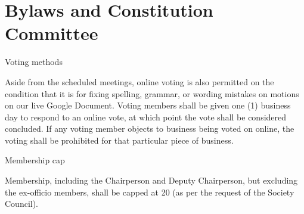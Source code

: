 \section{Bylaws and Constitution Committee}

\begin{longenum}
 \item Voting methods
 \begin{longenum}
 \item Aside from the scheduled meetings, online voting is also permitted on the condition that it is
for fixing spelling, grammar, or wording mistakes on motions on our live Google Document.
Voting members shall be given one (1) business day to respond to an online vote, at which
point the vote shall be considered concluded. If any voting member objects to business being
voted on online, the voting shall be prohibited for that particular piece of business.
 \end{longenum}
 \item Membership cap
  \begin{longenum}
  \item Membership, including the Chairperson and Deputy Chairperson, but excluding the ex-officio
members, shall be capped at 20 (as per the request of the Society Council).
  \end{longenum}
\end{longenum}